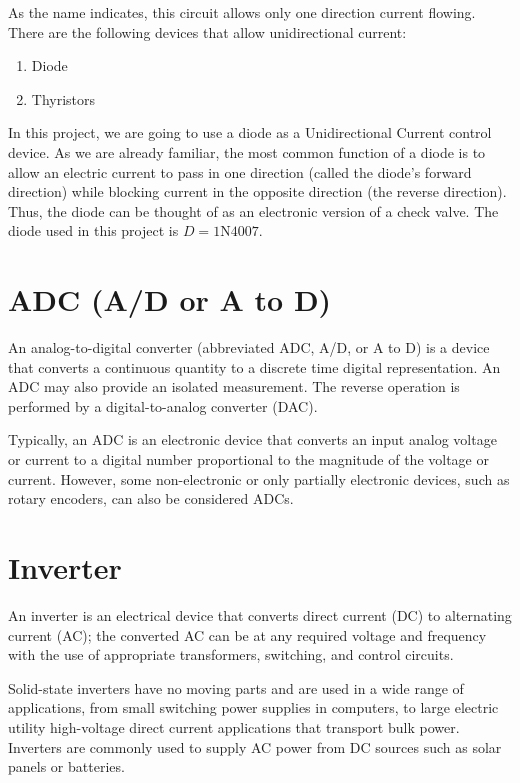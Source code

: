\documentclass[12pt]{article}
\begin{document}
As the name indicates, this circuit allows only one direction current flowing. There are the following devices that allow unidirectional current:

\begin{enumerate}
    \item Diode
    \item Thyristors
\end{enumerate}

In this project, we are going to use a diode as a Unidirectional Current control device. As we are already familiar, the most common function of a diode is to allow an electric current to pass in one direction (called the diode's forward direction) while blocking current in the opposite direction (the reverse direction). Thus, the diode can be thought of as an electronic version of a check valve. The diode used in this project is \(D = \text{1N4007}\).

\section*{ADC (A/D or A to D)}

An analog-to-digital converter (abbreviated ADC, A/D, or A to D) is a device that converts a continuous quantity to a discrete time digital representation. An ADC may also provide an isolated measurement. The reverse operation is performed by a digital-to-analog converter (DAC).

Typically, an ADC is an electronic device that converts an input analog voltage or current to a digital number proportional to the magnitude of the voltage or current. However, some non-electronic or only partially electronic devices, such as rotary encoders, can also be considered ADCs.
\newpage
\section*{Inverter}

An inverter is an electrical device that converts direct current (DC) to alternating current (AC); the converted AC can be at any required voltage and frequency with the use of appropriate transformers, switching, and control circuits.

Solid-state inverters have no moving parts and are used in a wide range of applications, from small switching power supplies in computers, to large electric utility high-voltage direct current applications that transport bulk power. Inverters are commonly used to supply AC power from DC sources such as solar panels or batteries.
\end{document}
